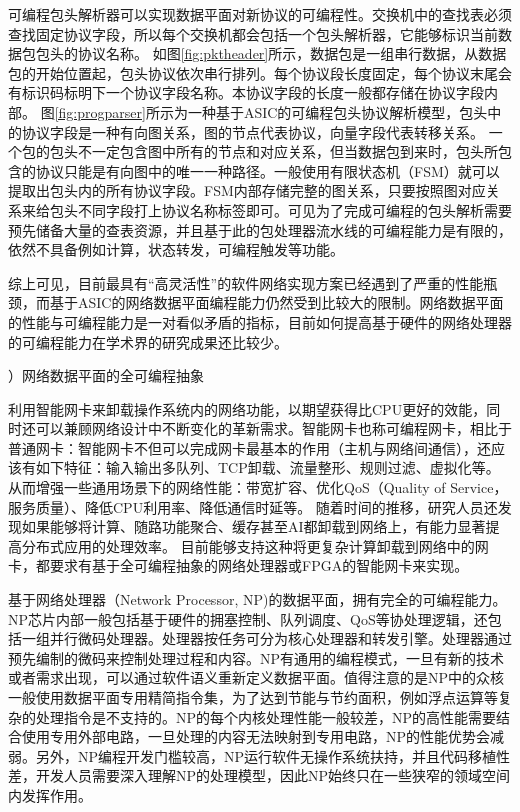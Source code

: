 可编程包头解析器可以实现数据平面对新协议的可编程性。交换机中的查找表必须查找固定协议字段，所以每个交换机都会包括一个包头解析器，它能够标识当前数据包包头的协议名称。
如图\ref{fig:pktheader}所示，数据包是一组串行数据，从数据包的开始位置起，包头协议依次串行排列。每个协议段长度固定，每个协议末尾会有标识码标明下一个协议字段名称。本协议字段的长度一般都存储在协议字段内部。
图\ref{fig:progparser}所示为一种基于ASIC的可编程包头协议解析模型，包头中的协议字段是一种有向图关系，图的节点代表协议，向量字段代表转移关系。
一个包的包头不一定包含图中所有的节点和对应关系，但当数据包到来时，包头所包含的协议只能是有向图中的唯一一种路径。一般使用有限状态机（FSM）就可以提取出包头内的所有协议字段。FSM内部存储完整的图关系，只要按照图对应关系来给包头不同字段打上协议名称标签即可。可见为了完成可编程的包头解析需要预先储备大量的查表资源，并且基于此的包处理器流水线的可编程能力是有限的，依然不具备例如计算，状态转发，可编程触发等功能。

综上可见，目前最具有“高灵活性”的软件网络实现方案已经遇到了严重的性能瓶颈，而基于ASIC的网络数据平面编程能力仍然受到比较大的限制。网络数据平面的性能与可编程能力是一对看似矛盾的指标，目前如何提高基于硬件的网络处理器的可编程能力在学术界的研究成果还比较少。


\label{chap123}


{）网络数据平面的全可编程抽象}


利用智能网卡来卸载操作系统内的网络功能，以期望获得比CPU更好的效能，同时还可以兼顾网络设计中不断变化的革新需求。智能网卡也称可编程网卡，相比于普通网卡：智能网卡不但可以完成网卡最基本的作用（主机与网络间通信），还应该有如下特征：输入输出多队列、TCP卸载、流量整形、规则过滤、虚拟化等。从而增强一些通用场景下的网络性能：带宽扩容、优化QoS（Quality of Service，服务质量）、降低CPU利用率、降低通信时延等。
随着时间的推移，研究人员还发现如果能够将计算、随路功能聚合、缓存甚至AI都卸载到网络上，有能力显著提高分布式应用的处理效率。
目前能够支持这种将更复杂计算卸载到网络中的网卡，都要求有基于全可编程抽象的网络处理器或FPGA的智能网卡来实现。

基于网络处理器（Network Processor, NP)的数据平面，拥有完全的可编程能力。NP芯片内部一般包括基于硬件的拥塞控制、队列调度、QoS等协处理逻辑，还包括一组并行微码处理器。处理器按任务可分为核心处理器和转发引擎。处理器通过预先编制的微码来控制处理过程和内容。NP有通用的编程模式，一旦有新的技术或者需求出现，可以通过软件语义重新定义数据平面。值得注意的是NP中的众核一般使用数据平面专用精简指令集，为了达到节能与节约面积，例如浮点运算等复杂的处理指令是不支持的。NP的每个内核处理性能一般较差，NP的高性能需要结合使用专用外部电路，一旦处理的内容无法映射到专用电路，NP的性能优势会减弱。另外，NP编程开发门槛较高，NP运行软件无操作系统扶持，并且代码移植性差，开发人员需要深入理解NP的处理模型，因此NP始终只在一些狭窄的领域空间内发挥作用。



